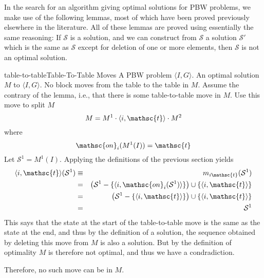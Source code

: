 \documentclass{article}
\newcommand{\bstate}{{\mathcal{S}}}
\newcommand{\tabtop}{{\mathsc{t}}}
\newcommand{\bon}{{\mathsc{on}}}
\begin{document}
In the search for an algorithm giving optimal solutions for PBW
problems, we make use of the following lemmas, most of which
have been proved previously elsewhere in the literature.  All
of these lemmas are proved using essentially the same
reasoning:  If $\bstate$ is a solution, and we can construct
from $\bstate$ a solution $\bstate'$ which is the same as
$\bstate$ except for deletion of one or more elements, then
$\bstate$ is not an optimal solution.

\begin{lemma}{table-to-table}{Table-To-Table Moves}
\given
A PBW problem $\langle I, G \rangle$.
An optimal solution $M$ to $\langle I, G \rangle$.
\prove
No block moves from the table to the table in $M$.
\proof
Assume the contrary of the lemma, i.e., that there is
some table-to-table move in $M$.
Use this move to split $M$ 
$$
  M = M^1 \cdot \langle i, \tabtop \rangle \cdot M^2
$$
where $$
  \bon_i(M^1(I)) = \tabtop
$$
Let $\bstate^1 = M^1(I)$.
Applying the definitions of the previous section yields
\begin{eqnarray*}
  \langle i, \tabtop \rangle(\bstate^1)
  &\equiv& m_{i \tabtop}(\bstate^1) \\
  &=& \left ( \bstate^1 - \{ \langle i, \bon_i(\bstate^1) \rangle \} \right )
  \cup \{ \langle i, \tabtop \rangle \} \\
  &=& \left ( \bstate^1 - \{ \langle i, \tabtop \rangle \} \right )
  \cup \{ \langle i, \tabtop \rangle \} \\
  &=& \bstate^1
\end{eqnarray*}
This says that the state at the start of the table-to-table
move is the same as the state at the end, and thus by the
definition of a solution, the sequence obtained by deleting
this move from $M$ is also a solution.  But by the definition
of optimality $M$ is therefore not optimal, and thus we have
a condradiction.

Therefore, no such move can be in $M$.
\end{lemma}
\end{document}
